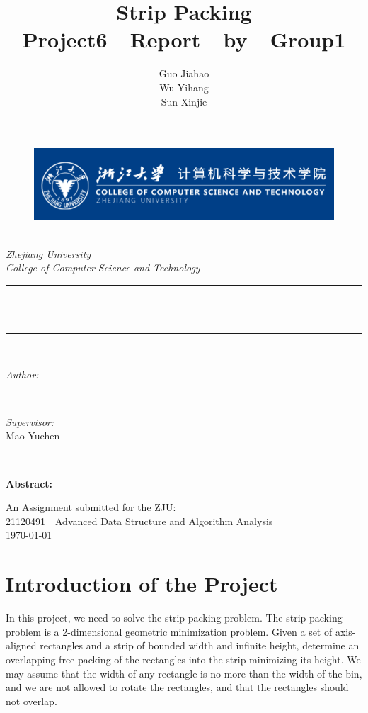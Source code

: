 \documentclass[12pt]{article}
\title{Strip Packing \\ \bigskip \large Project6\ \ Report\ \ by\ \ Group1}
\author{Guo Jiahao \\ Wu Yihang \\ Sun Xinjie}
\begin{document}
\begin{titlepage}
	\newcommand{\HRule}{\rule{\linewidth}{0.5mm}}
	\begin{figure}
        \flushleft
        \includegraphics[scale=0.4]{0.png}
    \end{figure}
    \center 
	\quad\\[1.5cm]
	\textsl{\Large Zhejiang University }\\[0.5cm] 
	\textsl{\large College of Computer Science and Technology}\\[0.5cm] 
	\makeatletter
	\HRule \\[0.4cm]
	{ \huge \bfseries \@title}\\[0.4cm] 
	\HRule \\[1.5cm]
	\begin{minipage}{0.4\textwidth}
		\begin{flushleft} \Large
			\emph{Author:}\\
			\@author 
		\end{flushleft}
	\end{minipage}
	~
	\begin{minipage}{0.4\textwidth}
		\begin{flushright} \Large
			\emph{Supervisor:} \\
			\textup{Mao Yuchen}
		\end{flushright}
	\end{minipage}\\[3cm]
	\makeatother
	\begin{flushleft}
        \Large
        \textbf{Abstract:}

    \end{flushleft}
    {\large An Assignment submitted for the ZJU:}\\[0.5cm]
	{\large {21120491\ \ Advanced Data Structure and Algorithm Analysis}}\\[0.5cm]
	{\large \today}\\[2cm] 
	\vfill 
\end{titlepage}
    
    \section{Introduction of the Project}
    In this project, we need to solve the strip packing problem.
    The strip packing problem is a 2-dimensional geometric minimization problem.
    Given a set of axis-aligned rectangles and a strip of bounded width and infinite height,
    determine an overlapping-free packing of the rectangles into the strip minimizing its height.
    We may assume that the width of any rectangle is no more than the width of the bin,
    and we are not allowed to rotate the rectangles, and that the rectangles should not overlap.
\end{document}
